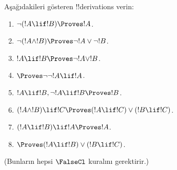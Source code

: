 \begin{prob}
Aşağıdakileri gösteren !!{derivation}s verin:
\begin{enumerate}
\item $\lnot(!A \lif !B) \Proves !A$.
\item $\lnot(!A \land !B) \Proves \lnot !A \lor \lnot !B$.
\item $!A \lif !B \Proves \lnot !A \lor !B$.
\item $\Proves \lnot \lnot !A \lif !A$.
\item $!A \lif !B, \lnot !A \lif !B \Proves !B$.
\item $(!A \land !B) \lif !C \Proves (!A \lif !C) \lor (!B \lif !C)$.
\item $(!A \lif !B) \lif !A \Proves !A$.
\item $\Proves (!A \lif !B) \lor (!B \lif !C)$.
\end{enumerate}
(Bunların hepsi $\FalseCl$ kuralını gerektirir.)
\end{prob}

